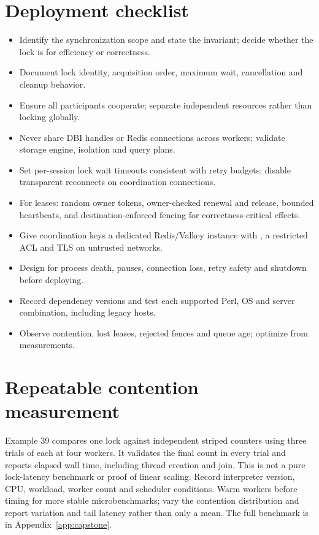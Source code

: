 \section{Deployment checklist}
\begin{itemize}
\item Identify the synchronization scope and state the invariant; decide whether the lock is for efficiency or correctness.
\item Document lock identity, acquisition order, maximum wait, cancellation and cleanup behavior.
\item Ensure all participants cooperate; separate independent resources rather than locking globally.
\item Never share DBI handles or Redis connections across workers; validate storage engine, isolation and query plans.
\item Set per-session lock wait timeouts consistent with retry budgets; disable transparent reconnects on coordination connections.
\item For leases: random owner tokens, owner-checked renewal and release, bounded heartbeats, and destination-enforced fencing for correctness-critical effects.
\item Give coordination keys a dedicated Redis/Valkey instance with , a restricted ACL and TLS on untrusted networks.
\item Design for process death, pauses, connection loss, retry safety and shutdown before deploying.
\item Record dependency versions and test each supported Perl, OS and server combination, including legacy hosts.
\item Observe contention, lost leases, rejected fences and queue age; optimize from measurements.
\end{itemize}




\section{Repeatable contention measurement}
Example 39 compares one lock against independent striped counters using
three trials of each at four workers. It validates the final count in
every trial and reports elapsed wall time, including thread creation
and join. This is not a pure lock-latency benchmark or proof of linear
scaling. Record interpreter version, CPU, workload, worker count and
scheduler conditions. Warm workers before timing for more stable
microbenchmarks; vary the contention distribution and report variation
and tail latency rather than only a mean. The full benchmark is in
Appendix~\ref{app:capstone}.
